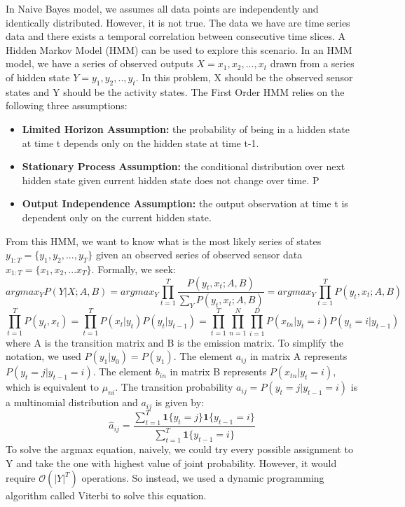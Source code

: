 \documentclass[10pt,letter]{article}
\numberwithin{equation}{section} %
\numberwithin{figure}{section} %
\numberwithin{table}{section} %
\begin{document}
In Naive Bayes model, we assumes all data points are independently and identically distributed. However, it is not true. The data we have are time series data and there exists a temporal correlation between consecutive time slices. A Hidden Markov Model (HMM) can be used to explore this scenario. In an HMM model, we have a series of observed outputs $X={x_1, x_2, ...,x_t}$ drawn from a series of hidden state $Y={y_1, y_2, ..,y_t}$. In this problem, X should be the observed sensor states and Y should be the activity states. The First Order HMM relies on the following three assumptions:
\begin{itemize}
\item \textbf{Limited Horizon Assumption:} the probability of being in a hidden state at time t depends only on the hidden state at time t-1.
\item \textbf{Stationary Process Assumption:} the conditional distribution over next hidden state given current hidden state does not change over time. P
\item \textbf{Output Independence Assumption:} the output observation at time t is dependent
only on the current hidden state.
\end{itemize}
From this HMM, we want to know what is the most likely series of states  $y_{1:T} = \{y_1,y_2,...,y_T\}$ given an observed series of observed sensor data $x_{1:T} = \{x_1,x_2,...x_T\}$. Formally, we seek:
$$arg max_{Y} P(Y|X; A, B) = arg max_{Y} \prod_{t=1}^{T} \frac{P(y_t, x_t; A, B)}{\sum_{Y} P(y_t,x_t; A,B)}= arg max_{Y} \prod_{t=1}^{T} P(y_t, x_t; A, B)$$
$$ \prod_{t=1}^{T} P(y_t, x_t) = \prod_{t=1}^T P(x_t|y_t)P(y_t|y_{t-1})=\prod_{t=1}^T\prod_{n=1}^N\prod_{i=1}^D P(x_{tn}|y_t = i)P(y_t=i|y_{t-1})$$
where A is the transition matrix and B is the emission matrix. To simplify the notation, we used $P(y_1|y_0)=P(y_1)$. The element $a_{ij}$ in matrix A represents $P(y_t=j|y_{t-1}=i)$. The element $b_{in}$ in matrix B represents $P(x_{tn}|y_t=i)$, which is equivalent to $\mu_{ni}$.  The transition probability $a_{ij}=P(y_t=j|y_{t-1}=i)$ is a multinomial distribution and $a_{ij}$ is given by:
$$\hat{a}_{ij} = \frac{\sum_{t=1}^T \mathbf{1}\{y_t=j\}\mathbf{1}\{y_{t-1}=i\}}{\sum_{t=1}^T \mathbf{1}\{y_{t-1}=i\}}$$
To solve the argmax equation, naively, we could try every possible assignment to Y and take the one with highest value of joint probability. However, it would require $\mathcal{O}(|Y|^T)$ operations. So instead, we used a dynamic programming algorithm called Viterbi to solve this equation. 
\end{document}
